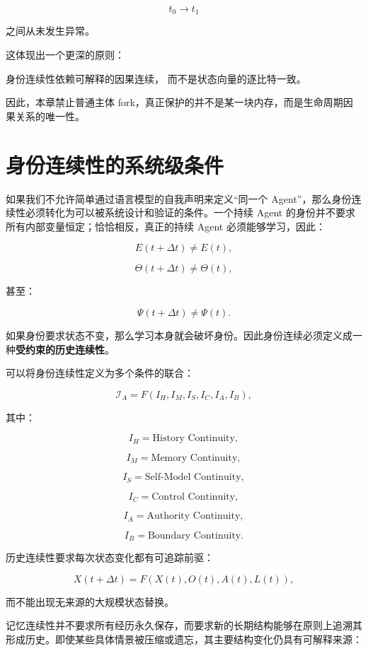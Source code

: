\[
t_0\rightarrow t_1
\]

之间从未发生异常。

这体现出一个更深的原则：

\begin{proposition*}
身份连续性依赖可解释的因果连续，
而不是状态向量的逐比特一致。
\end{proposition*}

因此，本章禁止普通主体 fork，真正保护的并不是某一块内存，而是生命周期因果关系的唯一性。

\section{身份连续性的系统级条件}

如果我们不允许简单通过语言模型的自我声明来定义“同一个 Agent”，那么身份连续性必须转化为可以被系统设计和验证的条件。一个持续 Agent 的身份并不要求所有内部变量恒定；恰恰相反，真正的持续 Agent 必须能够学习，因此：

\[
E(t+\Delta t)
\neq
E(t),
\]

\[
\Theta(t+\Delta t)
\neq
\Theta(t),
\]

甚至：

\[
\Psi(t+\Delta t)
\neq
\Psi(t).
\]

如果身份要求状态不变，那么学习本身就会破坏身份。因此身份连续必须定义成一种\textbf{受约束的历史连续性}。

可以将身份连续性定义为多个条件的联合：

\[
\mathcal{I}_A
=
F(
I_H,
I_M,
I_S,
I_C,
I_A,
I_B
),
\]

其中：

\[
I_H
=
\text{History Continuity},
\]

\[
I_M
=
\text{Memory Continuity},
\]

\[
I_S
=
\text{Self-Model Continuity},
\]

\[
I_C
=
\text{Control Continuity},
\]

\[
I_A
=
\text{Authority Continuity},
\]

\[
I_B
=
\text{Boundary Continuity}.
\]

历史连续性要求每次状态变化都有可追踪前驱：

\[
X(t+\Delta t)
=
F(
X(t),
O(t),
A(t),
L(t)
),
\]

而不能出现无来源的大规模状态替换。

记忆连续性并不要求所有经历永久保存，而要求新的长期结构能够在原则上追溯其形成历史。即使某些具体情景被压缩或遗忘，其主要结构变化仍具有可解释来源：

